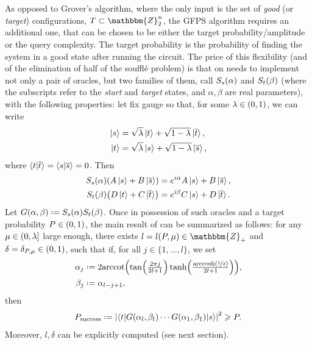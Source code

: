 \documentclass[reqno,10pt]{amsart}
\numberwithin{equation}{section}                %
\let\originalleft\left
\let\originalright\right
\renewcommand{\left}{\mathopen{}\mathclose\bgroup\originalleft}
\renewcommand{\right}{\aftergroup\egroup\originalright}
\def\({\mathopen{}\left(}
\def\){\right)\mathclose{}}
\newcommand*{\eqdef}{\mathrel{\vcenter{\baselineskip0.5ex \lineskiplimit0pt\hbox{.}\hbox{.}}}=}
\def\Z{\mathbbm{Z}}
\begin{document}
As opposed to Grover's algorithm, where the only input is the set of \emph{good} (or \emph{target}) configurations, $T \subset \Z_2^n$, the GFPS algorithm requires an additional one, that can be chosen to be either the target probability/amplitude or the query complexity. The target probability is the probability of finding the system in a good state after running the circuit. The price of this flexibility (and of the elimination of half of the souffl\'e problem) is that on needs to implement not only a pair of oracles, but two families of them, call $S_s \( \alpha \)$ and $S_t \( \beta \)$ (where the subscripts refer to the \emph{start} and \emph{target} states, and $\alpha, \beta$ are real parameters), with the following properties: let fix gauge so that, for some $\lambda \in \( 0, 1 \)$, we can write
\begin{align}
   \ket{s}  &= \sqrt{\lambda} \ket{t} + \sqrt{1 - \lambda} \ket{\overline{t}}, \\
   \ket{t}  &= \sqrt{\lambda} \ket{s} + \sqrt{1 - \lambda} \ket{\overline{s}},
\end{align}
where $\braket{t | \overline{t}} = \braket{s | \overline{s}} = 0$. Then
\begin{align}
   S_s \( \alpha \) \( A \ket{s} + B \ket{\overline{s}} \)  &= e^{i \alpha} A \ket{s} + B \ket{\overline{s}}, \\
   S_t \( \beta \) \( D \ket{t} + C \ket{\overline{t}} \)   &= e^{i \beta} C \ket{s} + D \ket{\overline{t}}.
\end{align}
Let $G \( \alpha, \beta \) \eqdef S_s \( \alpha \) S_t \( \beta \)$. Once in possession of such oracles and a target probability $P \in \( 0, 1 \)$, the main result of \cite{yoder_fixed_2014} can be summarized as follows: for any $\mu \in \( 0, \lambda \right]$ large enough, there exists $l = l \( P, \mu \) \in \Z_+$ and $\delta = \delta_{P, \mu} \in \( 0, 1 \)$, such that if, for all $j \in \{ 1, \ldots, l \}$, we set
\begin{align}
   \alpha_j &\eqdef 2 \mathrm{arccot} \( \tan \( \tfrac{2 \pi j}{2 l + 1} \) \tanh \( \tfrac{\mathrm{arccosh} \( \nicefrac{1}{\delta} \)}{2 l + 1} \) \), \\
   \beta_j  &\eqdef \alpha_{l - j + 1},
\end{align}
then
\begin{equation}
   P_{\mathrm{success}} \eqdef \left| \left\langle t \middle| G \( \alpha_l, \beta_l \) \cdots G \( \alpha_1, \beta_1 \) \middle| s \right\rangle \right|^2 \geqslant P.
\end{equation}
Moreover, $l, \delta$ can be explicitly computed (see next section).
\end{document}
